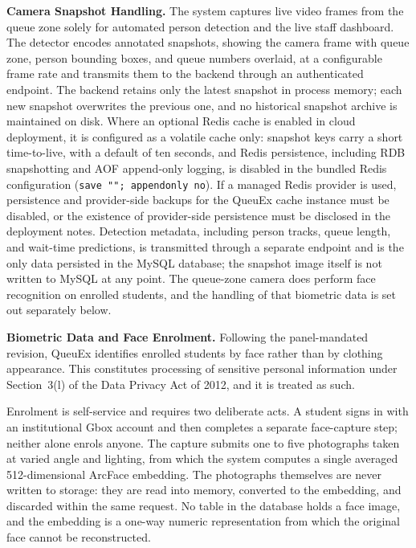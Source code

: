 \documentclass{research}
\newcommand{\sysname}{QueuEx}
\begin{document}
\textbf{Camera Snapshot Handling.} The system captures live video
frames from the queue zone solely for automated person detection and
the live staff dashboard. The detector encodes annotated snapshots,
showing the camera frame with queue zone, person bounding boxes, and
queue numbers overlaid, at a configurable frame rate and transmits them
to the backend through an authenticated endpoint. The backend retains
only the latest snapshot in process memory; each new snapshot
overwrites the previous one, and no historical snapshot archive is
maintained on disk. Where an optional Redis cache is enabled in cloud
deployment, it is configured as a volatile cache only: snapshot keys
carry a short time-to-live, with a default of ten seconds, and Redis
persistence, including RDB snapshotting and AOF append-only logging, is
disabled in the bundled Redis configuration
(\texttt{save ""; appendonly no}). If a managed Redis provider is used,
persistence and provider-side backups for the \sysname{} cache instance
must be disabled, or the existence of provider-side persistence must be
disclosed in the deployment notes. Detection metadata, including person
tracks, queue length, and wait-time predictions, is transmitted through
a separate endpoint and is the only data persisted in the MySQL
database; the snapshot image itself is not written to MySQL at any
point. The queue-zone camera does perform face recognition on enrolled
students, and the handling of that biometric data is set out separately
below.

\textbf{Biometric Data and Face Enrolment.} Following the panel-mandated
revision, \sysname{} identifies enrolled students by face rather than by
clothing appearance. This constitutes processing of sensitive personal
information under Section~3(l) of the Data Privacy Act of 2012, and it is
treated as such.

Enrolment is self-service and requires two deliberate acts. A student
signs in with an institutional Gbox account and then completes a separate
face-capture step; neither alone enrols anyone. The capture submits one to
five photographs taken at varied angle and lighting, from which the system
computes a single averaged 512-dimensional ArcFace embedding. The
photographs themselves are never written to storage: they are read into
memory, converted to the embedding, and discarded within the same request.
No table in the database holds a face image, and the embedding is a
one-way numeric representation from which the original face cannot be
reconstructed.
\end{document}
